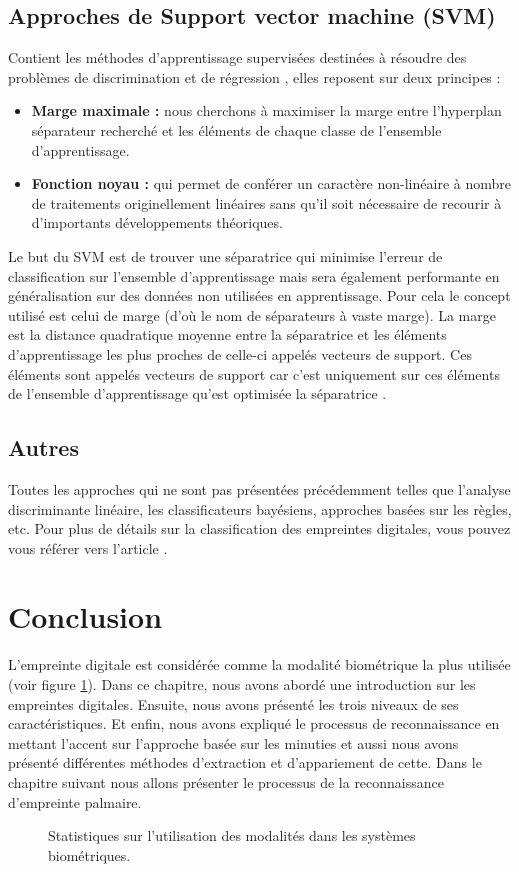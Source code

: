 \subsection{Approches de Support vector machine (SVM)  }
\label{SVM}
 Contient les méthodes d'apprentissage supervisées destinées à résoudre des problèmes de discrimination et de régression \citep{honeine2007methodes}, elles reposent sur deux principes :
\begin{itemize}
	\item  \textbf{ Marge maximale : }nous cherchons à maximiser la marge entre l'hyperplan séparateur recherché et les éléments de chaque classe de l'ensemble d'apprentissage.
	\item  \textbf{Fonction noyau :} qui permet de conférer un caractère non-linéaire à nombre de traitements originellement linéaires sans qu'il soit nécessaire de recourir à d'importants développements théoriques.
\end{itemize}
Le but du  SVM  est de trouver une séparatrice qui minimise l'erreur de classification sur l'ensemble d'apprentissage mais sera également performante en généralisation sur des données non utilisées en apprentissage. Pour cela le concept utilisé est celui de marge (d'où le nom de séparateurs à vaste marge). La marge est la distance quadratique moyenne entre la séparatrice et les éléments d'apprentissage les plus proches de celle-ci appelés vecteurs de support. Ces éléments sont appelés vecteurs de support car c'est uniquement sur ces éléments de l'ensemble d'apprentissage qu'est optimisée la séparatrice \citep{belahcene2012comparaison}.

\subsection{Autres}
Toutes les approches qui ne sont pas présentées précédemment telles que l'analyse discriminante linéaire, les classificateurs bayésiens, approches basées sur les règles, etc. Pour plus de détails sur la classification des empreintes digitales, vous pouvez vous référer vers l'article \citep{galar2015survey}.



\section{Conclusion}

L'empreinte digitale est considérée comme la modalité biométrique la plus utilisée (voir figure \ref{fig:chapitre2fingerstat}). Dans ce chapitre, nous avons abordé une introduction sur les empreintes digitales. Ensuite, nous avons présenté les trois niveaux de ses caractéristiques. Et enfin,  nous avons expliqué le processus de reconnaissance en mettant l'accent sur l'approche basée sur les minuties et aussi nous avons présenté différentes méthodes d'extraction et d'appariement de cette. Dans le chapitre suivant nous allons présenter le processus de la reconnaissance d'empreinte palmaire.
\begin{figure}[H]
	\centering
	\caption{Statistiques sur l'utilisation des modalités dans les systèmes biométriques\citep{Counter2016}.}
	\label{fig:chapitre2fingerstat}
\end{figure}